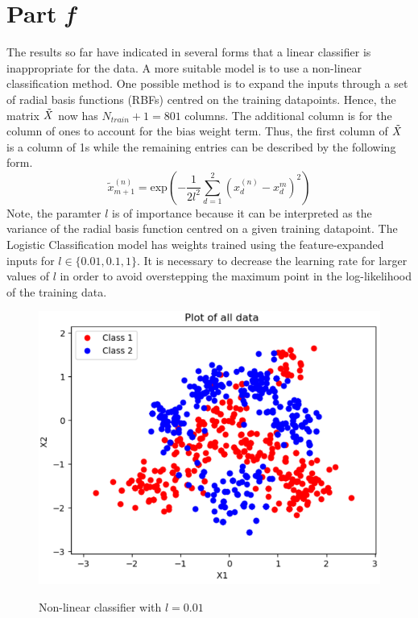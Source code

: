 \documentclass[twocolumn]{article}
\begin{document}
\section{Part \textit{f}}

The results so far have indicated in several forms that a linear classifier is inappropriate for the data. A more suitable model is to use a non-linear classification method. One possible method is to expand the inputs through a set of radial basis functions (RBFs) centred on the training datapoints. Hence, the matrix $\Tilde{X}$ now has $N_{train}+1=801$ columns. The additional column is for the column of ones to account for the bias weight term. Thus, the first column of $\Tilde{X}$ is a column of 1s while the remaining entries can be described by the following form.
$$\tilde{x}^{(n)}_{m+1}=\text{exp}\left(-\frac{1}{2l^2}\sum_{d=1}^{2}(x_d^{(n)}-x_d^{m})^2\right)$$
Note, the paramter $l$ is of importance because it can be interpreted as the variance of the radial basis function centred on a given training datapoint. The Logistic Classification model has weights trained using the feature-expanded inputs for $l\in\{0.01,0.1,1\}$. It is necessary to decrease the learning rate for larger values of $l$ in order to avoid overstepping the maximum point in the log-likelihood of the training data.

\begin{figure}[!htb]
	\centering\includegraphics[width=\columnwidth]{2}\\
	\caption{Non-linear classifier with $l=0.01$}\label{trian}
\end{figure}
\end{document}
